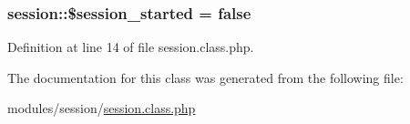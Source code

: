 \hypertarget{classsession_aae3391920555707a71e14e15f2929825}{
\subsubsection[{\$session\+\_\+started}]{\setlength{\rightskip}{0pt plus 5cm}session\+::\$session\+\_\+started = false}}\label{classsession_aae3391920555707a71e14e15f2929825}


Definition at line 14 of file session.\+class.\+php.



The documentation for this class was generated from the following file\+:\begin{DoxyCompactItemize}
\item 
modules/session/\hyperlink{session_8class_8php}{session.\+class.\+php}\end{DoxyCompactItemize}
